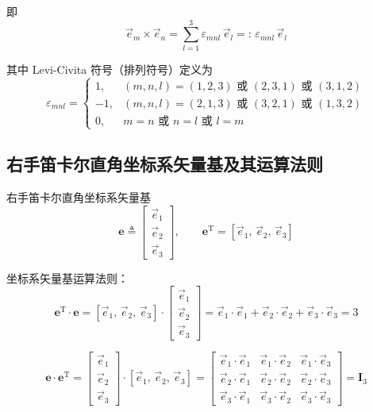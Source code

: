 即
\begin{equation}\label{eq:4.levi_civita}
\vec{e}_m \times \vec{e}_n = \sum_{l=1}^{3} \varepsilon_{mnl}\, \vec{e}_l =:\, \varepsilon_{mnl}\, \vec{e}_l
\end{equation}

其中 Levi-Civita 符号（排列符号）定义为
\begin{equation}\label{eq:4.epsilon_def}
\varepsilon_{mnl} = \begin{cases}
1, & (m, n, l) = (1, 2, 3) \text{ 或 } (2, 3, 1) \text{ 或 } (3, 1, 2) \\
-1, & (m, n, l) = (2, 1, 3) \text{ 或 } (3, 2, 1) \text{ 或 } (1, 3, 2) \\
0, & m = n \text{ 或 } n = l \text{ 或 } l = m
\end{cases}
\end{equation}


\subsection{右手笛卡尔直角坐标系矢量基及其运算法则}


右手笛卡尔直角坐标系矢量基
\begin{equation}
\boldsymbol{e} \triangleq \begin{bmatrix} \vec{e}_1 \\ \vec{e}_2 \\ \vec{e}_3 \end{bmatrix}, \qquad \boldsymbol{e}^{\mathrm{T}} = [\vec{e}_1,\, \vec{e}_2,\, \vec{e}_3]
\end{equation}

坐标系矢量基运算法则：
\begin{equation}
\boldsymbol{e}^{\mathrm{T}} \cdot \boldsymbol{e} = [\vec{e}_1,\, \vec{e}_2,\, \vec{e}_3] \cdot \begin{bmatrix} \vec{e}_1 \\ \vec{e}_2 \\ \vec{e}_3 \end{bmatrix} = \vec{e}_1 \cdot \vec{e}_1 + \vec{e}_2 \cdot \vec{e}_2 + \vec{e}_3 \cdot \vec{e}_3 = 3
\end{equation}

\begin{equation}
\boldsymbol{e} \cdot \boldsymbol{e}^{\mathrm{T}} = \begin{bmatrix} \vec{e}_1 \\ \vec{e}_2 \\ \vec{e}_3 \end{bmatrix} \cdot [\vec{e}_1,\, \vec{e}_2,\, \vec{e}_3] = \begin{bmatrix} \vec{e}_1 \cdot \vec{e}_1 & \vec{e}_1 \cdot \vec{e}_2 & \vec{e}_1 \cdot \vec{e}_3 \\ \vec{e}_2 \cdot \vec{e}_1 & \vec{e}_2 \cdot \vec{e}_2 & \vec{e}_2 \cdot \vec{e}_3 \\ \vec{e}_3 \cdot \vec{e}_1 & \vec{e}_3 \cdot \vec{e}_2 & \vec{e}_3 \cdot \vec{e}_3 \end{bmatrix} = \boldsymbol{I}_3
\end{equation}

